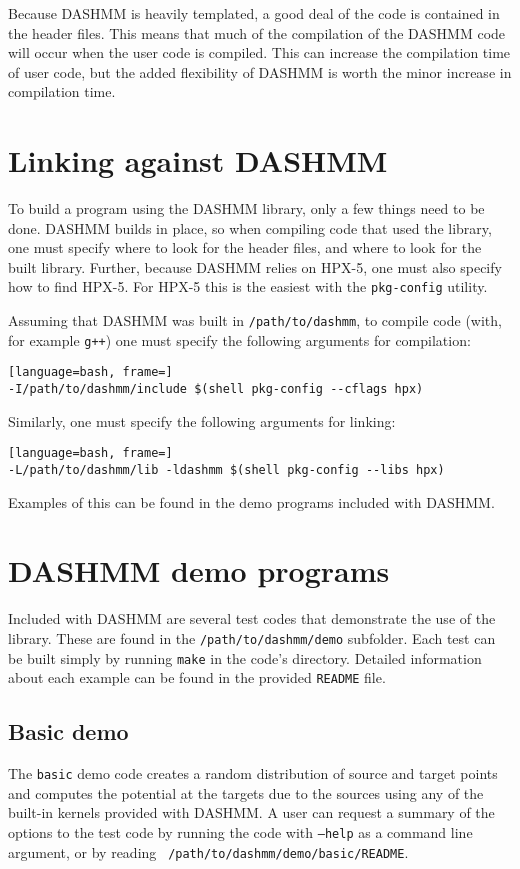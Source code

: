 Because DASHMM is heavily templated, a good deal of the code is
contained in the header files. This means that much of the compilation
of the DASHMM code will occur when the user code is compiled. This can
increase the compilation time of user code, but the added flexibility
of DASHMM is worth the minor increase in compilation time.

\section{Linking against DASHMM}

To build a program using the DASHMM library, only a few things need to
be done. DASHMM builds in place, so when compiling code that used the
library, one must specify where to look for the header files, and
where to look for the built library. Further, because DASHMM relies on
HPX-5, one must also specify how to find HPX-5. For HPX-5 this is the
easiest with the {\tt pkg-config} utility.

Assuming that DASHMM was built in {\tt /path/to/dashmm}, to compile
code (with, for example {\tt g++}) one must specify the following
arguments for compilation:

\begin{lstlisting}[language=bash, frame=]
-I/path/to/dashmm/include $(shell pkg-config --cflags hpx)
\end{lstlisting}

\noindent Similarly, one must specify the following arguments for linking:

\begin{lstlisting}[language=bash, frame=]
-L/path/to/dashmm/lib -ldashmm $(shell pkg-config --libs hpx)
\end{lstlisting}

\noindent Examples of this can be found in the demo programs included with
DASHMM.

\section{DASHMM demo programs}

Included with DASHMM are several test codes that demonstrate the use
of the library. These are found in the {\tt /path/to/dashmm/demo}
subfolder. Each test can be built simply by running {\tt make} in the
code's directory. Detailed information about each example can be found in
the provided {\tt README} file.

\subsection{Basic demo}
The {\tt basic} demo code creates a random distribution of source and
target points and computes the potential at the targets due to the
sources using any of the built-in kernels provided with DASHMM. A user
can request a summary of the options to the test code by running the
code with {\tt --help} as a command line argument, or by reading {\tt
  /path/to/dashmm/demo/basic/README}.

